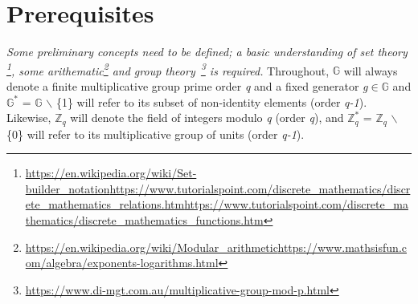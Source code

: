 \documentclass[a4paper]{article}
\begin{document}
\section{Prerequisites}
\textit{Some preliminary concepts need to be defined; a basic understanding of set theory \footnote{\url{https://en.wikipedia.org/wiki/Set-builder_notation}\newline \url{https://www.tutorialspoint.com/discrete_mathematics/discrete_mathematics_relations.htm}\newline \url{https://www.tutorialspoint.com/discrete_mathematics/discrete_mathematics_functions.htm}}, some arithematic\footnote{\url{https://en.wikipedia.org/wiki/Modular_arithmetic}\newline \url{https://www.mathsisfun.com/algebra/exponents-logarithms.html}} and group theory~\footnote{\url{https://www.di-mgt.com.au/multiplicative-group-mod-p.html}} is required.} 
\newline
Throughout, $\mathbb{G}$ will always denote a finite multiplicative group prime order \emph{q} and a fixed generator \emph{g}\(\in\)$\mathbb{G}$ and $\mathbb{G}^{*}$ = $\mathbb{G}$ \ensuremath{\backslash} \{1\} will refer to its subset of non-identity elements (order \emph{q-1}). Likewise, $\mathbb{Z}_q$ will denote the field of integers modulo \emph{q} (order \emph{q}), and $\mathbb{Z}^{*}_q$ = $\mathbb{Z}_q$ \ensuremath{\backslash} \{0\} will refer to its multiplicative group of units (order \emph{q-1}).
\end{document}
